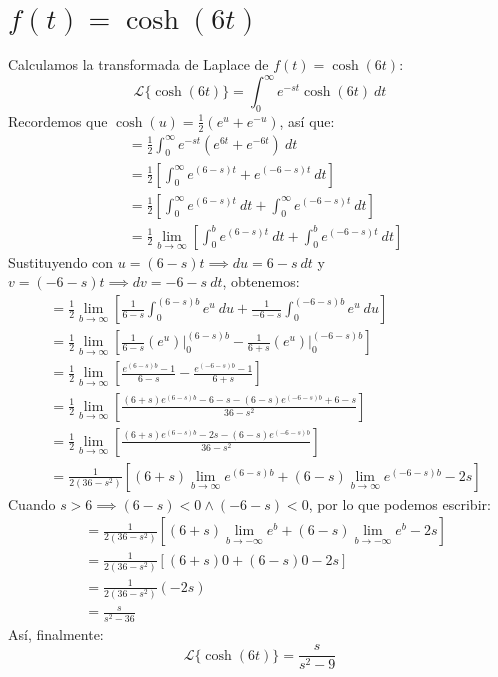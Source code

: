 \documentclass[12pt, a4paper]{article}
\begin{document}
\section{\texorpdfstring{\(f(t)=\cosh(6t)\)}{f (t) = cosh (6t)}}

Calculamos la transformada de Laplace de \(f(t) = \cosh(6t)\):
\[
	\mathcal{L}\{\cosh(6t)\} = \int_{0}^{\infty} e^{-st} \cosh(6t) \ dt
\]
Recordemos que \(\cosh(u) = \frac{1}{2} \left( e^{u} + e^{-u} \right) \), así que:
\begin{align*}
	&= \frac{1}{2} \int_{0}^{\infty} e^{-st} \left( e^{6t} + e^{-6t} \right)  \ dt \\
	&= \frac{1}{2} \left[ \int_{0}^{\infty} e^{(6-s)t} + e^{(-6-s)t} \ dt \right] \\
	&= \frac{1}{2} \left[ \int_{0}^{\infty} e^{(6-s)t} \ dt + \int_{0}^{\infty} e^{(-6-s)t} \ dt \right] \\
	&= \frac{1}{2} \lim_{b \to \infty} \left[ \int_{0}^{b} e^{(6-s)t} \ dt + \int_{0}^{b} e^{(-6-s)t} \ dt \right]
\end{align*}
Sustituyendo con \(u = (6-s)t \implies du = 6-s\ dt\) y \(v = (-6-s)t \implies dv = -6-s\ dt\), obtenemos:
\begin{align*}
	&= \frac{1}{2} \lim_{b \to \infty} \left[ \frac{1}{6-s} \int_{0}^{(6-s)b} e^{u} \ du + \frac{1}{-6-s} \int_{0}^{(-6-s)b} e^{u} \ du \right] \\
	&= \frac{1}{2} \lim_{b \to \infty} \left[ \frac{1}{6-s} \left. \left( e^{u} \right) \right|_{0}^{(6-s)b} - \frac{1}{6+s} \left. \left( e^{u} \right) \right|_{0}^{(-6-s)b} \right] \\
	&= \frac{1}{2} \lim_{b \to \infty} \left[ \frac{e^{(6-s)b} - 1}{6-s} - \frac{e^{(-6-s)b} - 1}{6+s} \right] \\
	&= \frac{1}{2} \lim_{b \to \infty} \left[ \frac{(6+s) e^{(6-s)b} - 6 - s - (6-s)e^{(-6-s)b} + 6 - s}{36 - s ^{2}} \right] \\
	&= \frac{1}{2} \lim_{b \to \infty} \left[ \frac{(6+s) e^{(6-s)b} - 2s - (6-s)e^{(-6-s)b}}{36-s ^{2}} \right] \\
	&= \frac{1}{2(36-s ^{2})} \left[ (6+s) \lim_{b \to \infty} e^{(6-s)b} + (6-s) \lim_{b \to \infty} e^{(-6-s)b} - 2s \right]
\end{align*}
Cuando \(s > 6 \implies (6-s) < 0 \land (-6-s) < 0\), por lo que podemos escribir:
\begin{align*}
	&= \frac{1}{2(36-s ^{2})} \left[ (6+s) \lim_{b \to -\infty} e^{b} + (6-s) \lim_{b \to -\infty} e^{b} - 2s \right] \\
	&= \frac{1}{2(36-s ^{2})} \left[ (6+s) 0 + (6-s) 0 - 2s \right] \\
	&= \frac{1}{2(36-s ^{2})} (-2s) \\
	&= \frac{s}{s ^{2} - 36}
\end{align*}
Así, finalmente:
\[
	\mathcal{L}\{\cosh(6t)\} = \frac{s}{s ^{2} - 9}
\]
\end{document}
